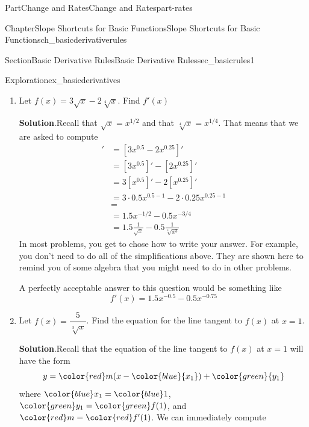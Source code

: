 \documentclass[oneside,10pt,]{tufte-book}
\newcommand{\blocktitlefont}{\relax}
\numberwithin{equation}{chapter}
\newcommand{\red}[1]{   {\color{red}   #1}   }
\newcommand{\blue}[1]{  {\color{blue}  #1}  }
\newcommand{\green}[1]{ {\color{green} #1} }
\newcommand{\amp}{&}
\begin{document}
\begin{partptx}{Part}{Change and Rates}{}{Change and Rates}{}{}{part-rates}
\begin{chapterptx}{Chapter}{Slope Shortcuts for Basic Functions}{}{Slope Shortcuts for Basic Functions}{}{}{ch_basicderivativerules}
\begin{sectionptx}{Section}{Basic Derivative Rules}{}{Basic Derivative Rules}{}{}{sec_basicrules1}
\begin{exploration}{Exploration}{}{ex_basicderivatives}
\begin{enumerate}[font=\bfseries,label=(\alph*),ref=\alph*]
\begin{align*}
[3x^{-1} + 5x^{-2}]' \amp = [3x^{-1}]' + [5x^{-2}]' \\
\amp = 3[x^{-1}]' + 5[x^{-2}]' \\
\amp = 3(-1) x^{-1-1} + 5(-2)x^{-2-1}\\
\amp = -3 x^{-2} - 10 x^{-3}\\
\amp = \dfrac{-3}{x^2} - \dfrac{10}{x^3}
\end{align*}
%
\item{}Let \(f(x) = 3\sqrt{x} - 2 \sqrt[4]{x}\).  Find \(f'(x)\)%
\par\smallskip%
\noindent\textbf{\blocktitlefont Solution}.\hypertarget{ex_basicderivatives-5-2}{}\quad{}Recall that \(\sqrt{x} = x^{1/2}\) and that \(\sqrt[4]{x} = x^{1/4}\).  That means that we are asked to compute%
\begin{align*}
[3 x^{1/2} - 2 x^{1/4}]' \amp = [3x^{0.5} - 2x^{0.25}]'\\
\amp =  [3 x^{0.5}]' - [2 x^{0.25}]'\\
\amp = 3[x^{0.5}]' -2[x^{0.25}]' \\
\amp = 3\cdot 0.5x^{0.5-1} - 2\cdot 0.25x^{0.25-1}\\
\amp = \\
\amp = 1.5 x^{-1/2} - 0.5 x^{-3/4}\\
\amp = 1.5 \frac{1}{\sqrt{x}} - 0.5 \frac{1}{\sqrt[4]{x^3}}
\end{align*}
In most problems, you get to chose how to write your answer.  For example, you don't need to do all of the simplifications above. They are shown here to remind you of some algebra that you might need to do in other problems.%
\par
A perfectly acceptable answer to this question would be something like%
\begin{equation*}
f'(x) = 1.5 x^{-0.5} - 0.5 x^{-0.75}
\end{equation*}
%
\item{}Let \(f(x) = \dfrac{5}{\sqrt[3]{x}}\).  Find the equation for the line tangent to \(f(x)\) at \(x=1\).%
\par\smallskip%
\noindent\textbf{\blocktitlefont Solution}.\hypertarget{ex_basicderivatives-6-2}{}\quad{}Recall that the equation of the line tangent to \(f(x)\) at \(x=1\) will have the form%
\begin{equation*}
y = \red{ m} (x - \blue{ {x_1}}) + \green{{ y_1}}
\end{equation*}
where \(\blue{x_1} = \blue 1\), \(\green{y_1} = \green{ f(1)}\), and \(\red m = \red{ f'(1)}\).  We can immediately compute%
\begin{equation*}

\end{equation*}
\end{enumerate}
\end{exploration}
\end{sectionptx}
\end{chapterptx}
\end{partptx}
\end{document}

